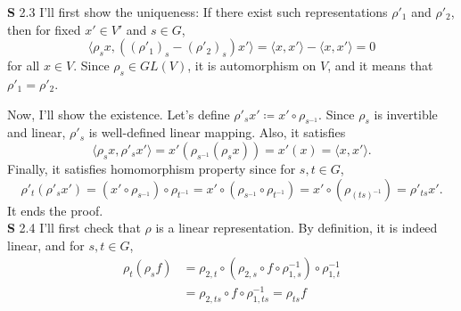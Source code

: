 \documentclass[a4paper, 12pt]{article}
\theoremstyle{Mydefinition}
\theoremstyle{Mytheorem}
\begin{document}
\noindent \textbf{S} 2.3
I'll first show the uniqueness: If there exist such representations $\rho'_1$ and $\rho'_2$, then for fixed $x'\in V'$ and $s\in G$,
\begin{equation}
    \langle \rho_s x, \left((\rho'_1)_s-(\rho'_2)_s\right)x'\rangle = \langle x,x'\rangle - \langle x,x'\rangle = 0
\end{equation}
for all $x\in V$. Since $\rho_s\in GL(V)$, it is automorphism on $V$, and it means that $\rho'_1 = \rho'_2$.

Now, I'll show the existence. Let's define $\rho'_s x' \coloneqq x'\circ \rho_{s^{-1}}$. Since $\rho_s$ is invertible and linear, $\rho'_s$ is well-defined linear mapping. Also, it satisfies
\begin{equation}
    \langle \rho_s x, \rho'_s x'\rangle = x'\left(\rho_{s^{-1}}(\rho_s x)\right) = x'(x) = \langle x, x'\rangle.
\end{equation}
Finally, it satisfies homomorphism property since for $s,t\in G$,
\begin{equation}
    \rho'_t(\rho'_s x') = (x'\circ \rho_{s^{-1}})\circ \rho_{t^{-1}} = x'\circ (\rho_{s^{-1}}\circ \rho_{t^{-1}}) = x'\circ (\rho_{(ts)^{-1}}) = \rho'_{ts}x'.
\end{equation}
It ends the proof.\\

\noindent \textbf{S} 2.4
I'll first check that $\rho$ is a linear representation. By definition, it is indeed linear, and for $s,t\in G$, 
\begin{equation}
    \begin{split}
        \rho_t(\rho_s f) &= \rho_{2,t}\circ \left(\rho_{2,s}\circ f\circ \rho_{1,s}^{-1}\right)\circ \rho_{1, t}^{-1} \\
        &= \rho_{2,ts}\circ f\circ \rho_{1,ts}^{-1} = \rho_{ts} f
    \end{split}
\end{equation}
\end{document}
